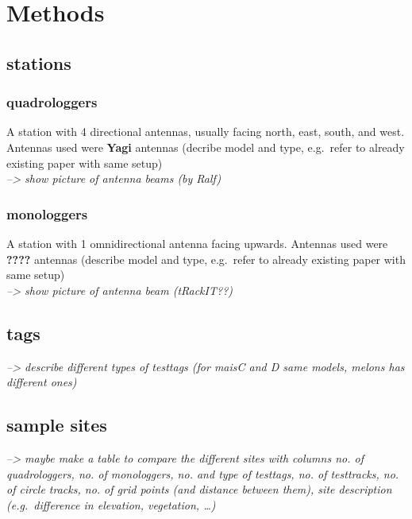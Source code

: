\documentclass[
]{article}
\begin{document}
\hypertarget{methods}{%
\section{Methods}\label{methods}}

\hypertarget{stations}{%
\subsection{stations}\label{stations}}

\hypertarget{quadrologgers}{%
\subsubsection{quadrologgers}\label{quadrologgers}}

A station with 4 directional antennas, usually facing north, east,
south, and west. Antennas used were \textbf{Yagi} antennas (decribe
model and type, e.g.~refer to already existing paper with same setup)\\
\emph{--\textgreater{} show picture of antenna beams (by Ralf)}

\hypertarget{monologgers}{%
\subsubsection{monologgers}\label{monologgers}}

A station with 1 omnidirectional antenna facing upwards. Antennas used
were \textbf{????} antennas (describe model and type, e.g.~refer to
already existing paper with same setup)\\
\emph{--\textgreater{} show picture of antenna beam (tRackIT??)}

\hypertarget{tags}{%
\subsection{tags}\label{tags}}

\emph{--\textgreater{} describe different types of testtags (for maisC
and D same models, melons has different ones)}

\hypertarget{sample-sites}{%
\subsection{sample sites}\label{sample-sites}}

\emph{--\textgreater{} maybe make a table to compare the different sites
with columns no. of quadrologgers, no. of monologgers, no. and type of
testtags, no. of testtracks, no. of circle tracks, no. of grid points
(and distance between them), site description (e.g.~difference in
elevation, vegetation, \ldots)}
\end{document}
